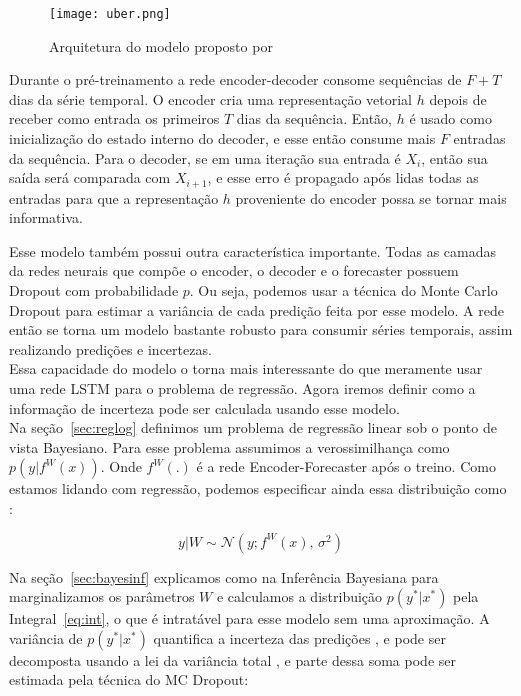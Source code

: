 \begin{figure}[H]
\centering
\texttt{[image: uber.png]}
\caption{Arquitetura do modelo proposto por \citep{ubertime}}
\end{figure}


Durante o pré-treinamento a rede encoder-decoder consome sequências de $F + T$ dias
da série temporal. O encoder cria uma representação vetorial $h$ depois de
receber como entrada os primeiros $T$ dias da sequência. Então, $h$ é usado como
inicialização do estado interno do decoder, e esse então consume mais $F$
entradas da sequência. Para o decoder, se em uma iteração sua entrada é $X_i$,
então sua saída será comparada com $X_{i+1}$, e esse erro é propagado após lidas
todas as entradas para que a representação $h$ proveniente do encoder possa se
tornar mais informativa.


Esse modelo também possui outra característica importante. Todas as camadas da
redes neurais que compõe o encoder, o decoder e o forecaster possuem
Dropout com probabilidade $p$. Ou seja, podemos usar a técnica do Monte
Carlo Dropout para estimar a variância de cada predição feita por esse modelo. A
rede então se torna um modelo bastante robusto para consumir séries temporais,
assim realizando predições e incertezas.\\


Essa capacidade do modelo o torna mais interessante do que meramente usar uma
rede LSTM para o problema de regressão. Agora iremos definir como a informação
de incerteza pode ser calculada usando esse modelo. \\

Na seção~\ref{sec:reglog} definimos um problema de regressão linear sob o ponto
de vista Bayesiano. Para esse problema assumimos a verossimilhança como $p(y |f^W(x))$.
Onde $f^W(.)$ é a rede Encoder-Forecaster após o treino.
Como estamos lidando com regressão, podemos especificar ainda essa distribuição
como \citep{ubertime}:  

\begin{equation}
  \label{eq:reg}
 y| W \sim \mathcal{N}(y;f^W(x),\,\sigma^2)
\end{equation}

 Na seção~\ref{sec:bayesinf} explicamos como na Inferência Bayesiana para marginalizamos os parâmetros $W$ e calculamos a distribuição $p(y^*
 | x^*)$ pela Integral~\ref{eq:int}, o que é intratável para esse modelo sem uma aproximação.
 A variância de $p(y^{*} | x^{*})$ quantifica a incerteza das predições
 \citep{dropbayes}, e pode ser decomposta usando a lei da variância total \citep{ubertime}, e parte dessa soma pode ser estimada pela técnica do MC Dropout: \\



